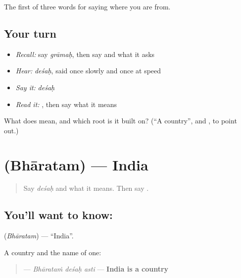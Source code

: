 \begin{grammarlens}[title={What you've built}]
The first of three words for saying where you are from.
\end{grammarlens}

\subsection*{Your turn}
\begin{itemize}
\raggedright
  \item \emph{Recall:} say \emph{grāmaḥ}, then say \textbf{} and what it asks
  \item \emph{Hear:} \emph{deśaḥ}, said once slowly and once at speed
  \item \emph{Say it:} \emph{deśaḥ}
  \item \emph{Read it:} \textbf{}, then say what it means
\end{itemize}

\begin{tcolorbox}[breakable,colback=teal!4,colframe=teal!35!black,title={Before you move on}]
What does \textbf{} mean, and which root is it built on? (\textquotedblleft{}A country\textquotedblright{}, and \textbf{}, to point out.)
\end{tcolorbox}
\section[\texorpdfstring{\sk{भारतम्} (Bhāratam)}{भारतम् (Bhāratam)}]{ (Bhāratam) — India}

\label{lesson:SA-C59-bharatam}



\begin{quote}
Say \emph{deśaḥ} and what it means. Then say \textbf{}.
\end{quote}

\subsection*{You'll want to know: }
\textbf{} (\emph{Bhāratam}) — \textquotedblleft{}India\textquotedblright{}.

A country and the name of one:

\begin{quote}
\textbf{  } — \emph{Bhārataṁ deśaḥ asti} — \textbf{India is a country}
\end{quote}

